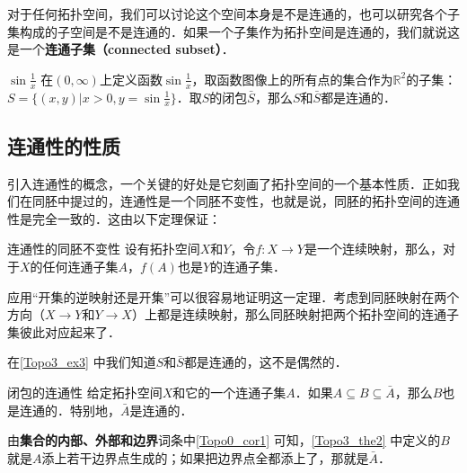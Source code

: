 对于任何拓扑空间，我们可以讨论这个空间本身是不是连通的，也可以研究各个子集构成的子空间是不是连通的．如果一个子集作为拓扑空间是连通的，我们就说这是一个\textbf{连通子集（connected subset）}．

\begin{example}{$\sin{\frac{1}{x}}$}\label{Topo3_ex3}
在$(0,\infty)$上定义函数$\sin{\frac{1}{x}}$，取函数图像上的所有点的集合作为$\mathbb{R}^2$的子集：$S=\{(x, y)|x>0, y=\sin{\frac{1}{x}}\}$．取$S$的闭包$\bar{S}$，那么$S$和$\bar{S}$都是连通的．
\end{example}

\subsection{连通性的性质}

引入连通性的概念，一个关键的好处是它刻画了拓扑空间的一个基本性质．正如我们在同胚中提过的，连通性是一个同胚不变性，也就是说，同胚的拓扑空间的连通性是完全一致的．这由以下定理保证：

\begin{theorem}{连通性的同胚不变性}\label{Topo3_the1}
设有拓扑空间$X$和$Y$，令$f:X\rightarrow Y$是一个连续映射，那么，对于$X$的任何连通子集$A$，$f(A)$也是$Y$的连通子集．
\end{theorem}

应用“开集的逆映射还是开集”可以很容易地证明这一定理．考虑到同胚映射在两个方向（$X\rightarrow Y$和$Y\rightarrow X$）上都是连续映射，那么同胚映射把两个拓扑空间的连通子集彼此对应起来了．

在\autoref{Topo3_ex3} 中我们知道$S$和$\bar{S}$都是连通的，这不是偶然的．

\begin{theorem}{闭包的连通性}\label{Topo3_the2}
给定拓扑空间$X$和它的一个连通子集$A$．如果$A\subseteq B\subseteq\bar{A}$，那么$B$也是连通的．特别地，$\bar{A}$是连通的．
\end{theorem}

由\textbf{集合的内部、外部和边界}词条中\autoref{Topo0_cor1} 可知，\autoref{Topo3_the2} 中定义的$B$就是$A$添上若干边界点生成的；如果把边界点全都添上了，那就是$\bar{A}$．